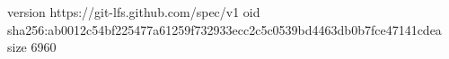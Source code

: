 version https://git-lfs.github.com/spec/v1
oid sha256:ab0012c54bf225477a61259f732933ecc2c5c0539bd4463db0b7fce47141cdea
size 6960
